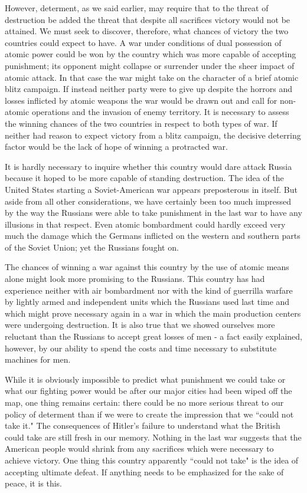 However, determent, as we said earlier, may require that to the threat of destruction be added the threat that despite all sacrifices victory would not be attained. We must seek to discover, therefore, what chances of victory the two countries could expect to have. A war under conditions of dual possession of atomic power could be won by the country which was more capable of accepting punishment; its opponent might collapse or surrender under the sheer impact of atomic attack. In that case the war might take on the character of a brief atomic blitz campaign. If instead neither party were to give up despite the horrors and losses inflicted by atomic weapons the war would be drawn out and call for non-atomic operations and the invasion of enemy territory. It is necessary to assess the winning chances of the two countries in respect to both types of war. If neither had reason to expect victory from a blitz campaign, the decisive deterring factor would be the lack of hope of winning a protracted war.

It is hardly necessary to inquire whether this country would dare attack Russia because it hoped to be more capable of standing destruction. The idea of the United States starting a Soviet-American war appears preposterous in itself. But aside from all other considerations, we have certainly been too much impressed by the way the Russians were able to take punishment in the last war to have any illusions in that respect. Even atomic bombardment could hardly exceed very much the damage which the Germans inflicted on the western and southern parts of the Soviet Union; yet the Russians fought on.

The chances of winning a war against this country by the use of atomic means alone might look more promising to the Russians. This country has had experience neither with air bombardment nor with the kind of guerrilla warfare by lightly armed and independent units which the Russians used last time and which might prove necessary again in a war in which the main production centers were undergoing destruction. It is also true that we showed ourselves more reluctant than the Russians to accept great losses of men - a fact easily explained, however, by our ability to spend the costs and time necessary to substitute machines for men.

While it is obviously impossible to predict what punishment we could take or what our fighting power would be after our major cities had been wiped off the map, one thing remains certain: there could be no more serious threat to our policy of determent than if we were to create the impression that we ``could not take it." The consequences of Hitler's failure to understand what the British could take are still fresh in our memory. Nothing in the last war suggests that the American people would shrink from any sacrifices which were necessary to achieve victory. One thing this country apparently ``could not take" is the idea of accepting ultimate defeat. If anything needs to be emphasized for the sake of peace, it is this.

